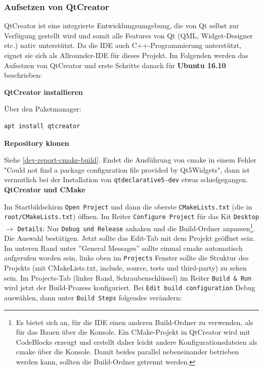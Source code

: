 
\subsubsection{Aufsetzen von QtCreator}

QtCreator ist eine integrierte Entwicklungsumgebung, die von Qt selbst zur
Verfügung gestellt wird und somit alle Features von Qt (QML, Widget-Designer
etc.) nativ unterstützt. Da die IDE auch C++-Programmierung unterstützt, eignet
sie sich als Allrounder-IDE für dieses Projekt. Im Folgenden werden das
Aufsetzen von QtCreator und erste Schritte danach für \textbf{Ubuntu 16.10}
beschrieben:

\textbf{QtCreator installieren}

Über den Paketmanager:
\begin{lstlisting}
apt install qtcreator
\end{lstlisting}

\textbf{Repository klonen}

Siehe \autoref{dev-report-cmake-build}. Endet die Ausführung von cmake in einem
Fehler "Could not find a package configuration file provided by Qt5Widgets",
dann ist vermutlich bei der Installation von \texttt{qtdeclarative5-dev} etwas
schiefgegangen.\\

\textbf{QtCreator und CMake}

Im Startbildschirm \texttt{Open Project} und dann die oberste
\texttt{CMakeLists.txt} (die in \texttt{root/CMakeLists.txt}) öffnen. Im Reiter
\texttt{Configure Project} für das Kit \texttt{Desktop} $\rightarrow$
\texttt{Details}: Nur \texttt{Debug und Release} anhaken und die Build-Ordner
anpassen\footnote{Es bietet sich an, für die IDE einen anderen Build-Ordner zu
verwenden, als für das Bauen über die Konsole. Ein CMake-Projekt in QtCreator
wird mit CodeBlocks erzeugt und erstellt daher leicht andere
Konfigurationsdateien als cmake über die Konsole. Damit beides parallel
nebeneinander betrieben werden kann, sollten die Build-Ordner getrennt werden.}.
Die Auswahl bestätigen. Jetzt sollte das Edit-Tab mit dem Projekt geöffnet sein.
Im unteren Rand unter ''General Messages'' sollte einmal cmake automatisch
aufgerufen worden sein, links oben im \texttt{Projects} Fenster sollte die
Struktur des Projekts (mit CMakeLists.txt, include, source, tests und
third-party) zu sehen sein. Im Projects-Tab (linker Rand, Schraubenschlüssel) im
Reiter \texttt{Build \& Run} wird jetzt der Build-Prozess konfiguriert. Bei
\texttt{Edit build configuration} Debug auswählen, dann unter \texttt{Build
Steps} folgendes verändern:

